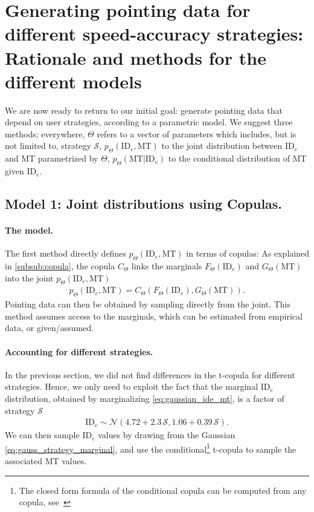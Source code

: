 \documentclass[manuscript,review,anonymous]{acmart}
\newcommand{\ide}{\ensuremath{{\text{ID}_e}}\xspace}
\begin{document}
\section{Generating pointing data for different speed-accuracy strategies: Rationale and methods for the different models \label{sec:gen}}


We are now ready to return to our initial goal: generate pointing data that depend on user strategies, according to a parametric model. We suggest three methods; everywhere, $\Theta$ refers to a vector of parameters which includes, but is not limited to, strategy $\mathcal{S}$, $p_{\Theta}(\ide, \text{MT})$ to the joint distribution between \ide and MT parametrized by $\Theta$, $p_{\Theta}(\text{MT}|\ide)$ to the conditional distribution of MT given \ide.


\subsection{Model 1: Joint distributions using Copulas.}
\paragraph{The model.} The first method directly defines $p_{\Theta}(\ide, \text{MT})$ in terms of copulas: As explained in \autoref{subsub:copula}, the copula $C_{\Theta}$ links the marginals $F_{\Theta}(\ide)$ and $G_{\Theta}(\text{MT})$ into the joint $p_{\Theta}(\ide, \text{MT})$
\begin{align}
	p_{\Theta}(\ide, \text{MT}) = C_{\Theta}(F_{\Theta}(\ide), G_{\Theta}(\text{MT})).
\end{align}
Pointing data can then be obtained by sampling directly from the joint. This method assumes access to the marginals, which can be estimated from empirical data, or given/assumed.

\paragraph{Accounting for different strategies.} In the previous section, we did not find differences in the t-copula for different strategies. Hence, we only need to exploit the fact that the marginal \ide distribution, obtained by marginalizing \autoref{eq:gaussian_ide_mt}, is a factor of strategy $\mathcal{S}$ \ie
\begin{align}
	\ide \sim \mathcal{N}(4.72 + 2.3\,\mathcal{S}, 1.06 + 0.39\,\mathcal{S}). \label{eq:gauss_strategy_marginal}
\end{align}
We can then sample \ide values by drawing from the Gaussian \autoref{eq:gauss_strategy_marginal}, and use the conditional\footnote{The closed form formula of the conditional copula can be computed from any copula, see~\cite{nelsen2006}} t-copula to sample the associated MT values.
\end{document}
